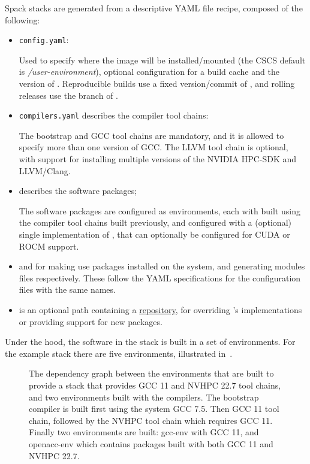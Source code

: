 Spack stacks are generated from a descriptive YAML file recipe, composed of the following:
\begin{itemize}
    \item  \lstinline{config.yaml}:
        
        Used to specify where the image will be installed/mounted (the CSCS default is \emph{/user-environment}), optional configuration for a \spack build cache and the version of \spack. Reproducible builds use a fixed version/commit of \spack, and rolling releases use the  branch of \spack.
    \item \lstinline{compilers.yaml} describes the compiler tool chains:
        
        The bootstrap and GCC tool chains are mandatory, and it is allowed to specify more than one version of GCC.
        The LLVM tool chain is optional, with support for installing multiple versions of the NVIDIA HPC-SDK and LLVM/Clang.
    \item {} describes the software packages;
        
        The software packages are configured as environments, each with built using the compiler tool chains built previously, and configured with a (optional) single implementation of \craympich, that can optionally be configured for CUDA or ROCM support.
    \item {} and 
        for making \spack use packages installed on the system, and generating modules files respectively.
        These follow the YAML specifications for the \spack configuration files with the same names.
    \item {}
        is an optional path containing a \href{https://spack.readthedocs.io/en/latest/repositories.html}{\spack repository}, for overriding \spack's implementations or providing support for new packages.
\end{itemize}

Under the hood, the software in the stack is built in a set of \spack environments.
For the example stack there are five environments, illustrated in~.

\begin{figure}[htp!]
    \begin{center}
    
    \end{center}
    \caption{The dependency graph between the \spack environments that are built to provide a \spack stack that provides GCC 11 and NVHPC 22.7 tool chains, and two environments built with the compilers. The bootstrap compiler is built first using the system GCC 7.5. Then GCC 11 tool chain, followed by the NVHPC tool chain which requires GCC 11. Finally two environments are built: gcc-env with GCC 11, and openacc-env which contains packages built with both GCC 11 and NVHPC 22.7.}
    \label{fig:env-dag}
\end{figure}

